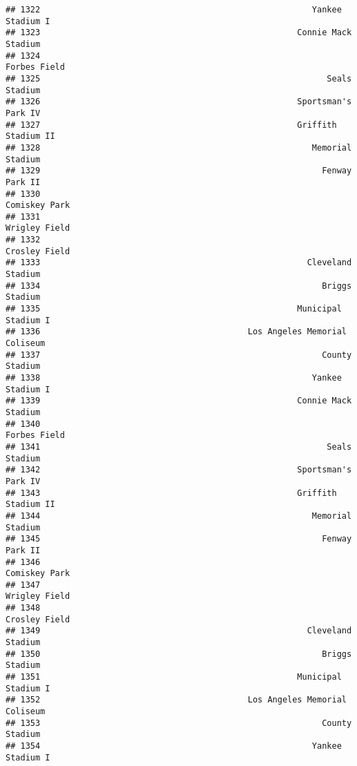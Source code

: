 \documentclass[]{article}
\begin{document}
\begin{verbatim}
## 1322                                                       Yankee Stadium I
## 1323                                                    Connie Mack Stadium
## 1324                                                           Forbes Field
## 1325                                                          Seals Stadium
## 1326                                                    Sportsman's Park IV
## 1327                                                    Griffith Stadium II
## 1328                                                       Memorial Stadium
## 1329                                                         Fenway Park II
## 1330                                                          Comiskey Park
## 1331                                                          Wrigley Field
## 1332                                                          Crosley Field
## 1333                                                      Cleveland Stadium
## 1334                                                         Briggs Stadium
## 1335                                                    Municipal Stadium I
## 1336                                          Los Angeles Memorial Coliseum
## 1337                                                         County Stadium
## 1338                                                       Yankee Stadium I
## 1339                                                    Connie Mack Stadium
## 1340                                                           Forbes Field
## 1341                                                          Seals Stadium
## 1342                                                    Sportsman's Park IV
## 1343                                                    Griffith Stadium II
## 1344                                                       Memorial Stadium
## 1345                                                         Fenway Park II
## 1346                                                          Comiskey Park
## 1347                                                          Wrigley Field
## 1348                                                          Crosley Field
## 1349                                                      Cleveland Stadium
## 1350                                                         Briggs Stadium
## 1351                                                    Municipal Stadium I
## 1352                                          Los Angeles Memorial Coliseum
## 1353                                                         County Stadium
## 1354                                                       Yankee Stadium I

\end{verbatim}
\end{document}
